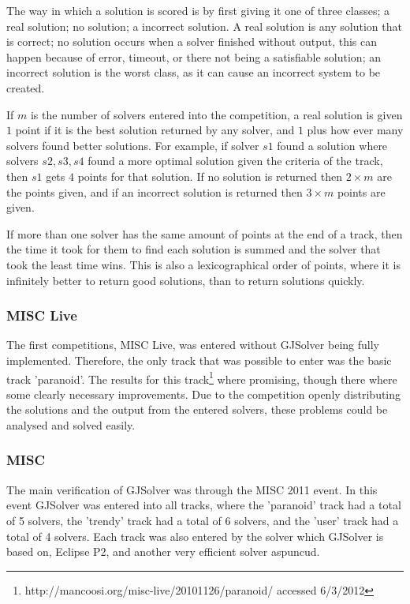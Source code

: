 The way in which a solution is scored is by first giving it one of three classes; a real solution; no solution; a incorrect solution.
A real solution is any solution that is correct; no solution occurs when a solver finished without output, this can happen because of error, timeout, or there not being a satisfiable solution;
an incorrect solution is the worst class, as it can cause an incorrect system to be created.

If $m$ is the number of solvers entered into the competition,
a real solution is given $1$ point if it is the best solution returned by any solver, and $1$ plus how ever many solvers found better solutions.
For example, if solver $s1$ found a solution where solvers $s2,s3,s4$ found a more optimal solution given the criteria of the track, then $s1$ gets $4$ points for that solution.
If no solution is returned then $2\times m$ are the points given, and if an incorrect solution is returned then $3 \times m$ points are given.

If more than one solver has the same amount of points at the end of a track, then the time it took for them to find each solution is summed and the solver that took the least time wins.
This is also a lexicographical order of points, where it is infinitely better to return good solutions, than to return solutions quickly.

\subsubsection{MISC Live}
The first competitions, MISC Live, was entered without GJSolver being fully implemented.
Therefore, the only track that was possible to enter was the basic track 'paranoid'.
The results for this track\footnote{http://mancoosi.org/misc-live/20101126/paranoid/ accessed 6/3/2012} where promising, though there where some clearly necessary improvements.
Due to the competition openly distributing the solutions and the output from the entered solvers, these problems could be analysed and solved easily.

\subsubsection{MISC}
The main verification of GJSolver was through the MISC 2011 event.
In this event GJSolver was entered into all tracks, where the 'paranoid' track had a total of 5 solvers, the 'trendy' track had a total of 6 solvers, 
and the 'user' track had a total of 4 solvers.
Each track was also entered by the solver which GJSolver is based on, Eclipse P2, and another very efficient solver aspuncud.

